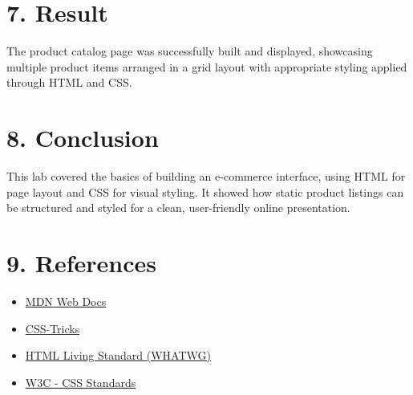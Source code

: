 \documentclass[a4paper,12pt]{article}
\begin{document}
\section*{7. Result}
The product catalog page was successfully built and displayed, showcasing multiple product items arranged in a grid layout with appropriate styling applied through HTML and CSS.

\section*{8. Conclusion}
This lab covered the basics of building an e-commerce interface, using HTML for page layout and CSS for visual styling. It showed how static product listings can be structured and styled for a clean, user-friendly online presentation.


\section*{9. References}
\begin{itemize}
    \item \href{https://developer.mozilla.org/en-US/docs/Web}{MDN Web Docs}
    \item \href{https://css-tricks.com}{CSS-Tricks}
    \item \href{https://html.spec.whatwg.org/}{HTML Living Standard (WHATWG)}
    \item \href{https://www.w3.org/TR/CSS/#css}{W3C - CSS Standards}
\end{itemize}
\end{document}
